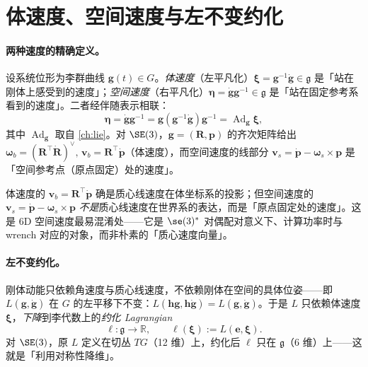 \section{体速度、空间速度与左不变约化}
\label{sec:gm-bodyvel}

\paragraph{两种速度的精确定义。}
设系统位形为李群曲线 $\mathbf g(t)\in G$。\emph{体速度}（左平凡化）$\boldsymbol\xi=\mathbf g^{-1}\dot{\mathbf g}\in\mathfrak g$ 是「站在刚体上感受到的速度」；\emph{空间速度}（右平凡化）$\boldsymbol\eta=\dot{\mathbf g}\mathbf g^{-1}\in\mathfrak g$ 是「站在固定参考系看到的速度」。二者经伴随表示相联：
\begin{equation}
  \boldsymbol\eta=\dot{\mathbf g}\mathbf g^{-1}=\mathbf g(\mathbf g^{-1}\dot{\mathbf g})\mathbf g^{-1}=\operatorname{Ad}_{\mathbf g}\boldsymbol\xi,
  \label{eq:gm-ad-eta-xi}
\end{equation}
其中 $\operatorname{Ad}_{\mathbf g}$ 取自 \cref{ch:lie}。对 $\SE(3)$，$\mathbf g=(\mathbf R,\mathbf p)$ 的齐次矩阵给出
$\boldsymbol\omega_b=(\mathbf R^\top\dot{\mathbf R})^\vee,\,\mathbf v_b=\mathbf R^\top\dot{\mathbf p}$（体速度），而空间速度的线部分 $\mathbf v_s=\dot{\mathbf p}-\boldsymbol\omega_s\times\mathbf p$ 是「空间参考点（原点固定）处的速度」。

\begin{pitfall}
体速度的 $\mathbf v_b=\mathbf R^\top\dot{\mathbf p}$ 确是质心线速度在体坐标系的投影；但空间速度的 $\mathbf v_s=\dot{\mathbf p}-\boldsymbol\omega_s\times\mathbf p$ \emph{不是}质心线速度在世界系的表达，而是「原点固定处的速度」。这是 $6$D 空间速度最易混淆处——它是 $\se(3)^*$ 对偶配对意义下、计算功率时与 wrench 对应的对象，而非朴素的「质心速度向量」。
\end{pitfall}

\paragraph{左不变约化。}
刚体动能只依赖角速度与质心线速度，不依赖刚体在空间的具体位姿——即 $L(\mathbf g,\dot{\mathbf g})$ 在 $G$ 的左平移下不变：$L(\mathbf h\mathbf g,\mathbf h\dot{\mathbf g})=L(\mathbf g,\dot{\mathbf g})$。于是 $L$ 只依赖体速度 $\boldsymbol\xi$，\emph{下降}到李代数上的\emph{约化 Lagrangian}
\begin{equation}
  \ell:\mathfrak g\to\mathbb R,\qquad \ell(\boldsymbol\xi):=L(\mathbf e,\boldsymbol\xi).
  \label{eq:gm-reduced-lagrangian}
\end{equation}
对 $\SE(3)$，原 $L$ 定义在切丛 $TG$（12 维）上，约化后 $\ell$ 只在 $\mathfrak g$（6 维）上——这就是「利用对称性降维」。

